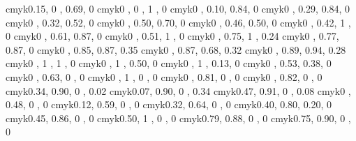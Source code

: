 

\definecolor{greenyellow}   {cmyk}{0.15, 0   , 0.69, 0   }
\definecolor{yellow}        {cmyk}{0   , 0   , 1   , 0   }
\definecolor{goldenrod}     {cmyk}{0   , 0.10, 0.84, 0   }
\definecolor{dandelion}     {cmyk}{0   , 0.29, 0.84, 0   }
\definecolor{apricot}       {cmyk}{0   , 0.32, 0.52, 0   }
\definecolor{peach}         {cmyk}{0   , 0.50, 0.70, 0   }
\definecolor{melon}         {cmyk}{0   , 0.46, 0.50, 0   }
\definecolor{yelloworange}  {cmyk}{0   , 0.42, 1   , 0   }
\definecolor{orange}        {cmyk}{0   , 0.61, 0.87, 0   }
\definecolor{burntorange}   {cmyk}{0   , 0.51, 1   , 0   }
\definecolor{bittersweet}   {cmyk}{0   , 0.75, 1   , 0.24}
\definecolor{redorange}     {cmyk}{0   , 0.77, 0.87, 0   }
\definecolor{mahogany}      {cmyk}{0   , 0.85, 0.87, 0.35}
\definecolor{maroon}        {cmyk}{0   , 0.87, 0.68, 0.32}
\definecolor{brickred}      {cmyk}{0   , 0.89, 0.94, 0.28}
\definecolor{red}           {cmyk}{0   , 1   , 1   , 0   }
\definecolor{orangered}     {cmyk}{0   , 1   , 0.50, 0   }
\definecolor{rubinered}     {cmyk}{0   , 1   , 0.13, 0   }
\definecolor{salmon}        {cmyk}{0   , 0.53, 0.38, 0   }
\definecolor{carnationpink} {cmyk}{0   , 0.63, 0   , 0   }
\definecolor{magenta}       {cmyk}{0   , 1   , 0   , 0   }
\definecolor{violetred}     {cmyk}{0   , 0.81, 0   , 0   }
\definecolor{rhodamine}     {cmyk}{0   , 0.82, 0   , 0   }
\definecolor{mulberry}      {cmyk}{0.34, 0.90, 0   , 0.02}
\definecolor{redviolet}     {cmyk}{0.07, 0.90, 0   , 0.34}
\definecolor{fuchsia}       {cmyk}{0.47, 0.91, 0   , 0.08}
\definecolor{lavender}      {cmyk}{0   , 0.48, 0   , 0   }
\definecolor{thistle}       {cmyk}{0.12, 0.59, 0   , 0   }
\definecolor{orchid}        {cmyk}{0.32, 0.64, 0   , 0   }
\definecolor{darkorchid}    {cmyk}{0.40, 0.80, 0.20, 0   }
\definecolor{purple}        {cmyk}{0.45, 0.86, 0   , 0   }
\definecolor{plum}          {cmyk}{0.50, 1   , 0   , 0   }
\definecolor{violet}        {cmyk}{0.79, 0.88, 0   , 0   }
\definecolor{royalpurple}   {cmyk}{0.75, 0.90, 0   , 0   }
